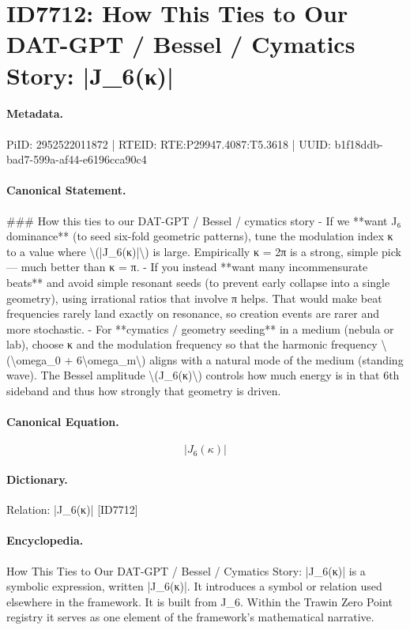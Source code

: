\section*{ID7712: How This Ties to Our DAT-GPT / Bessel / Cymatics Story: |J\_6(κ)|}
\paragraph{Metadata.}
PiID: 2952522011872 | RTEID: RTE:P29947.4087:T5.3618 | UUID: b1f18ddb-bad7-599a-af44-e6196cca90c4

\paragraph{Canonical Statement.}
\#\#\# How this ties to our DAT-GPT / Bessel / cymatics story - If we **want J₆ dominance** (to seed six-fold geometric patterns), tune the modulation index κ to a value where \textbackslash{}(|J\_6(κ)|\textbackslash{}) is large. Empirically κ = 2π is a strong, simple pick — much better than κ = π. - If you instead **want many incommensurate beats** and avoid simple resonant seeds (to prevent early collapse into a single geometry), using irrational ratios that involve π helps. That would make beat frequencies rarely land exactly on resonance, so creation events are rarer and more stochastic. - For **cymatics / geometry seeding** in a medium (nebula or lab), choose κ and the modulation frequency so that the harmonic frequency \textbackslash{}(\textbackslash{}omega\_0 + 6\textbackslash{}omega\_m\textbackslash{}) aligns with a natural mode of the medium (standing wave). The Bessel amplitude \textbackslash{}(J\_6(κ)\textbackslash{}) controls how much energy is in that 6th sideband and thus how strongly that geometry is driven.

\paragraph{Canonical Equation.}
\[
|J_6(κ)|
\]

\paragraph{Dictionary.}
Relation: |J\_6(κ)| [ID7712]

\paragraph{Encyclopedia.}
How This Ties to Our DAT-GPT / Bessel / Cymatics Story: |J\_6(κ)| is a symbolic expression, written |J\_6(κ)|. It introduces a symbol or relation used elsewhere in the framework. It is built from J\_6. Within the Trawin Zero Point registry it serves as one element of the framework's mathematical narrative.
